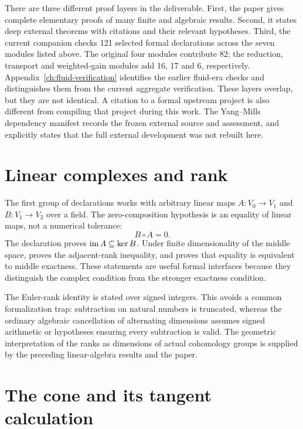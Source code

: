 There are three different proof layers in the deliverable. First, the paper
gives complete elementary proofs of many finite and algebraic results.
Second, it states deep external theorems with citations and their relevant
hypotheses. Third, the current companion checks 121 selected formal declarations
across the seven modules listed above. The original four modules contribute 82;
the reduction, transport and weighted-gain modules add 16, 17 and 6, respectively.
Appendix~\ref{ch:fluid-verification} identifies the earlier fluid-era checks
and distinguishes them from the current aggregate verification.
These layers overlap, but they are not identical. A citation to a formal
upstream project is also different from compiling that project during this
work. The Yang--Mills dependency manifest records the frozen external source
and assessment, and explicitly states that the full external development
was not rebuilt here.

\section{Linear complexes and rank}

The first group of declarations works with arbitrary linear maps
$A:V_0\to V_1$ and $B:V_1\to V_2$ over a field. The zero-composition
hypothesis is an equality of linear maps, not a numerical tolerance:
\[
 B\circ A=0.
\]
The declaration  proves
$\operatorname{im} A\subseteq\ker B$. Under finite dimensionality of the middle space,
 proves the adjacent-rank inequality, and
 proves that equality is equivalent to
middle exactness. These statements are useful formal interfaces because
they distinguish the complex condition from the stronger exactness
condition.

The Euler-rank identity is stated over signed integers. This avoids a common
formalization trap: subtraction on natural numbers is truncated, whereas
the ordinary algebraic cancellation of alternating dimensions assumes
signed arithmetic or hypotheses ensuring every subtraction is valid. The
geometric interpretation of the ranks as dimensions of actual cohomology
groups is supplied by the preceding linear-algebra results and the paper.

\section{The cone and its tangent calculation}

